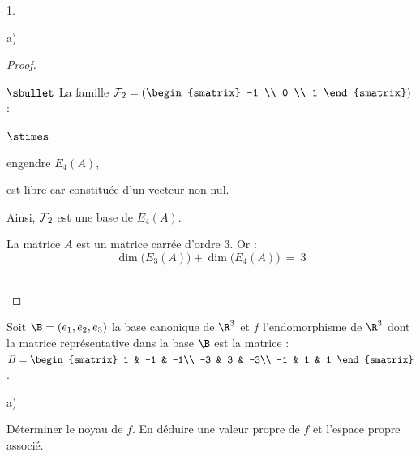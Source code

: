 \begin{noliste}{1.}
\begin{noliste}{a)}
\begin{proof}
\begin{noliste}{$\sbullet$}
          \noindent
          La famille ${\cal F}_2 = \left(
          \begin{smatrix}
            -1 \\
            0 \\
            1
            \end{smatrix}
          \right)$ :
          \begin{noliste}{$\stimes$}
          \item engendre $E_4(A)$,
          \item est libre car constituée d'un vecteur non nul.
          \end{noliste}
          Ainsi, ${\cal F}_2$ est une base de $E_4(A)$.%

      \item La matrice $A$ est un matrice carrée d'ordre $3$. Or :
        \[
        \dim\big( E_3(A) \big) + \dim\big( E_4(A) \big) \ = \ 3
        \]
        ~\\[-1.2cm]
      \end{noliste}
    \end{proof}

  \end{noliste}

\item Soit $\B = (e_{1},e_{2},e_{3})$ la base canonique de $\R^{3}$ et
  $f$ l'endomorphisme de $\R^{3}$ dont la matrice représentative dans
  la base $\B$ est la matrice : $B =
  \begin{smatrix}
    1 & -1 & -1\\
    -3 & 3 & -3\\
    -1 & 1 & 1
  \end{smatrix}
  $.
  \begin{noliste}{a)}
    \setlength{\itemsep}{2mm}
  \item Déterminer le noyau de $f$. En déduire une valeur propre de
    $f$ et l'espace propre associé.


\end{noliste}
\end{noliste}
